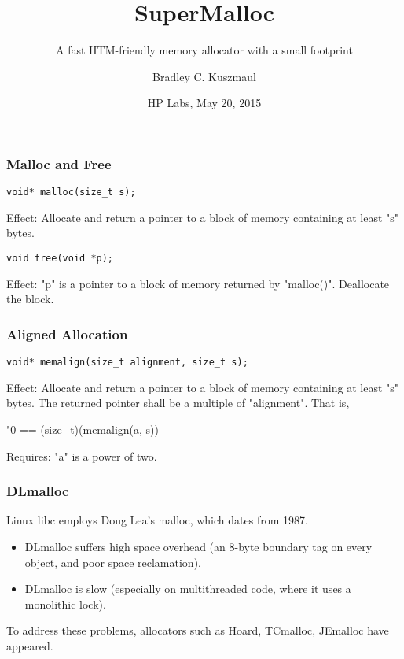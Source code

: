 \documentclass[xcolor=dvipsnames,14pt]{beamer}
\begin{document}
\title{SuperMalloc}
\subtitle{A fast HTM-friendly memory allocator with a small footprint}

\author{Bradley C. Kuszmaul}
\date{HP Labs, May  20, 2015}
\frame{\titlepage}

\begin{frame}[fragile]
\frametitle{Malloc and Free}
\begin{verbatim}
void* malloc(size_t s);
\end{verbatim}

Effect: Allocate and return a pointer to a block of memory containing at least "s" bytes.

\begin{verbatim}
void free(void *p);
\end{verbatim}

Effect: "p" is a pointer to a block of memory returned by "malloc()".  Deallocate the block.
\end{frame}

\begin{frame}[fragile]
\frametitle{Aligned Allocation}

\begin{verbatim}
void* memalign(size_t alignment, size_t s);
\end{verbatim}


Effect: Allocate and return a pointer to a block of memory containing at least "s" bytes.  
The returned pointer shall be a multiple of "alignment".  That is,
\begin{center}
"0 == (size_t)(memalign(a, s)) %
\end{center}

Requires: "a" is a power of two.
\end{frame}

\begin{frame}
\frametitle{DLmalloc}

Linux libc employs Doug Lea's malloc, which dates from 1987.

\begin{itemize}
\item DLmalloc suffers high space overhead (an 8-byte boundary tag on every object, and poor space reclamation).
\item DLmalloc is slow (especially on multithreaded code, where it uses a monolithic lock).
\end{itemize}

To address these problems, allocators such as Hoard, TCmalloc, JEmalloc have appeared.

\end{frame}
\end{document}
